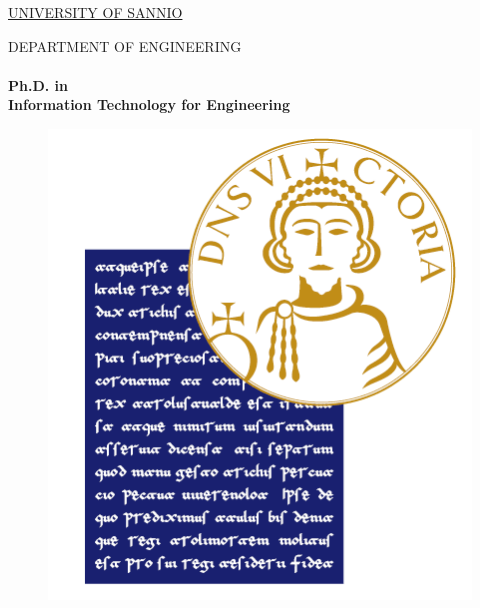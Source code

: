 \linespread{1} %

\thispagestyle{empty}
\large


\begin{center}
   \huge{{\underline{\textsc{UNIVERSITY OF SANNIO}}}}
\end{center}
   
\begin{center}   
   \huge{{\textsc{DEPARTMENT OF ENGINEERING}}}
   \\
   \LARGE{\textbf{\\ Ph.D. in\\ Information Technology for Engineering
 }}      

\end{center}

            \begin{figure}[h]
                        \begin{center}
                        \includegraphics[scale=0.3]{figure/logoUnisannio.png}
                        \end{center}
            \end{figure}

